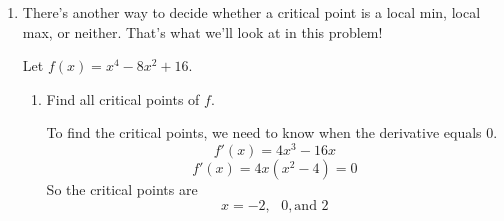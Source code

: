 \documentclass{article}
\begin{document}
\begin{enumerate}[resume]
\begin{enumerate}
  \item
    \begin{problem}[\vfill]
      Make a sign chart for $f'$, and use this to decide whether each of
      the critical points you found is a local minimum, a local maximum,
      or neither.
    \end{problem}


    \begin{solution}
      \begin{center}
      \end{center}
      So, there is a local maximum at $x = -2$ and a local minimum at $x = 0$.
    \end{solution}

  \end{enumerate}

  \pspace{\newpage}

\item  


  There's another way to decide whether a critical point is a local min, local max, or neither. That's what we'll look at in this problem!

  Let $f(x) = x^4 - 8x^2 + 16$.
  \begin{enumerate}
  \item
    \begin{problem}[\vfill]
      Find all critical points of $f$. 
    \end{problem}

    \begin{solution} 
      To find the critical points, we need to know when the derivative equals 0. 
        $$f'(x) = 4x^3-16x$$
        $$f'(x) =4x(x^2-4)=0$$ 
        So the critical points are
        $$x=-2,\text{ } 0, \text{and } 2$$
    \end{solution} 


\end{enumerate}
\end{enumerate}
\end{document}
